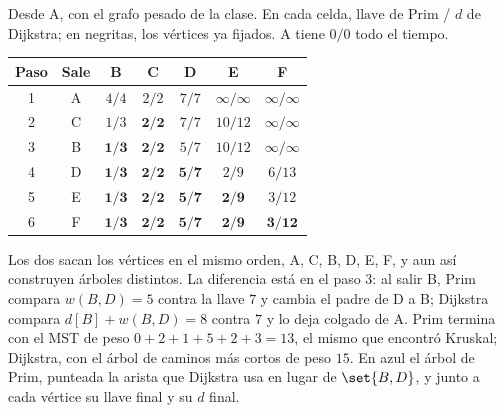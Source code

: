 \documentclass[11pt,letterpaper]{article}
\begin{document}
\begin{ejemplo}
  \label{ej:prim-dijkstra}
  Desde A, con el grafo pesado de la clase. En cada celda,
  $\text{llave}$ de Prim / $d$ de Dijkstra; en negritas, los vértices
  ya fijados. A tiene $0 / 0$ todo el tiempo.
  \begin{center}
  \small
  \begin{tabular}{ccccccc}
    \toprule
    \textbf{Paso} & \textbf{Sale} & B & C & D & E & F \\
    \midrule
    1 & A & $4 / 4$ & $2 / 2$ & $7 / 7$ & $\infty / \infty$
      & $\infty / \infty$ \\
    2 & C & $1 / 3$ & $\mathbf{2 / 2}$ & $7 / 7$ & $10 / 12$
      & $\infty / \infty$ \\
    3 & B & $\mathbf{1 / 3}$ & $\mathbf{2 / 2}$ & $5 / 7$ & $10 / 12$
      & $\infty / \infty$ \\
    4 & D & $\mathbf{1 / 3}$ & $\mathbf{2 / 2}$ & $\mathbf{5 / 7}$
      & $2 / 9$ & $6 / 13$ \\
    5 & E & $\mathbf{1 / 3}$ & $\mathbf{2 / 2}$ & $\mathbf{5 / 7}$
      & $\mathbf{2 / 9}$ & $3 / 12$ \\
    6 & F & $\mathbf{1 / 3}$ & $\mathbf{2 / 2}$ & $\mathbf{5 / 7}$
      & $\mathbf{2 / 9}$ & $\mathbf{3 / 12}$ \\
    \bottomrule
  \end{tabular}
  \end{center}
  Los dos sacan los vértices en el mismo orden, A, C, B, D, E, F, y aun
  así construyen árboles distintos. La diferencia está en el paso 3:
  al salir B, Prim compara $w(B, D) = 5$ contra la llave $7$ y cambia
  el padre de D a B; Dijkstra compara $d[B] + w(B, D) = 8$ contra $7$
  y lo deja colgado de A. Prim termina con el MST de peso
  $0 + 2 + 1 + 5 + 2 + 3 = 13$, el mismo que encontró Kruskal;
  Dijkstra, con el árbol de caminos más cortos de peso $15$. En azul el
  árbol de Prim, punteada la arista que Dijkstra usa en lugar de
  $\set{B, D}$, y junto a cada vértice su llave final y su $d$ final.
  \begin{center}
  \end{center}
\end{ejemplo}
\end{document}
